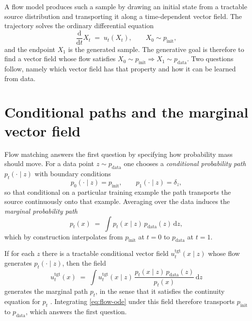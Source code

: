 \documentclass[11pt,a4paper]{report}
\theoremstyle{plain}
\theoremstyle{definition}
\theoremstyle{remark}
\newcommand{\dif}{\mathrm{d}}
\newcommand{\vfield}{u}
\begin{document}
A flow model produces such a sample by drawing an initial state from a
tractable source distribution and transporting it along a time-dependent
vector field. The trajectory solves the ordinary differential equation
\begin{equation}
  \frac{\dif}{\dif t} X_t \;=\; \vfield_t(X_t),
  \qquad X_0 \sim p_{\mathrm{init}},
  \label{eq:flow-ode}
\end{equation}
and the endpoint $X_1$ is the generated sample. The generative goal is
therefore to find a vector field whose flow satisfies
$X_0 \sim p_{\mathrm{init}} \Rightarrow X_1 \sim p_{\mathrm{data}}$. Two
questions follow, namely which vector field has that property and how it can
be learned from data.

\section{Conditional paths and the marginal vector field}

Flow matching answers the first question by specifying how probability mass
should move. For a data point $z \sim p_{\mathrm{data}}$ one chooses a
\emph{conditional probability path} $p_t(\cdot \mid z)$ with boundary
conditions
\begin{equation}
  p_0(\cdot \mid z) = p_{\mathrm{init}},
  \qquad
  p_1(\cdot \mid z) = \delta_z ,
  \label{eq:path-boundaries}
\end{equation}
so that conditional on a particular training example the path transports the
source continuously onto that example. Averaging over the data induces the
\emph{marginal probability path}
\begin{equation}
  p_t(x) \;=\; \int p_t(x\mid z)\, p_{\mathrm{data}}(z)\, \dif z ,
  \label{eq:marginal-path}
\end{equation}
which by construction interpolates from $p_{\mathrm{init}}$ at $t=0$ to
$p_{\mathrm{data}}$ at $t=1$.

If for each $z$ there is a tractable conditional vector field
$\vfield_t^{\mathrm{tgt}}(x\mid z)$ whose flow generates
$p_t(\cdot\mid z)$, then the field
\begin{equation}
  \vfield_t^{\mathrm{tgt}}(x)
  \;=\; \int \vfield_t^{\mathrm{tgt}}(x\mid z)\,
        \frac{p_t(x\mid z)\,p_{\mathrm{data}}(z)}{p_t(x)}\,\dif z
  \label{eq:marginal-field}
\end{equation}
generates the marginal path $p_t$, in the sense that it satisfies the
continuity equation for $p_t$
\citep[Theorem~9]{holderrieth2025flowmatching}. Integrating
\eqref{eq:flow-ode} under this field therefore transports
$p_{\mathrm{init}}$ to $p_{\mathrm{data}}$, which answers the first question.
\end{document}

